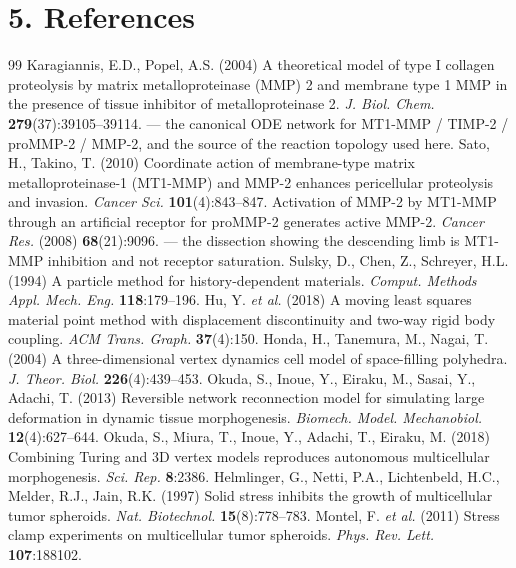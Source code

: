 \documentclass[10pt,a4paper]{article}
\begin{document}
\section*{5.\; References}

{\small
\begin{thebibliography}{99}\setlength{\itemsep}{0pt}
 Karagiannis, E.D., Popel, A.S. (2004) A theoretical model of type I
collagen proteolysis by matrix metalloproteinase (MMP) 2 and membrane type 1 MMP in the presence of
tissue inhibitor of metalloproteinase 2. \emph{J. Biol. Chem.} \textbf{279}(37):39105--39114. --- the
canonical ODE network for MT1-MMP / TIMP-2 / proMMP-2 / MMP-2, and the source of the reaction topology
used here.
 Sato, H., Takino, T. (2010) Coordinate action of membrane-type matrix
metalloproteinase-1 (MT1-MMP) and MMP-2 enhances pericellular proteolysis and invasion.
\emph{Cancer Sci.} \textbf{101}(4):843--847.
 Activation of MMP-2 by MT1-MMP through an artificial receptor for proMMP-2
generates active MMP-2. \emph{Cancer Res.} (2008) \textbf{68}(21):9096. --- the dissection showing the
descending limb is MT1-MMP inhibition and not receptor saturation.
 Sulsky, D., Chen, Z., Schreyer, H.L. (1994) A particle method for
history-dependent materials. \emph{Comput. Methods Appl. Mech. Eng.} \textbf{118}:179--196.
 Hu, Y. \emph{et al.} (2018) A moving least squares material point method with
displacement discontinuity and two-way rigid body coupling. \emph{ACM Trans. Graph.} \textbf{37}(4):150.
 Honda, H., Tanemura, M., Nagai, T. (2004) A three-dimensional vertex dynamics cell
model of space-filling polyhedra. \emph{J. Theor. Biol.} \textbf{226}(4):439--453.
 Okuda, S., Inoue, Y., Eiraku, M., Sasai, Y., Adachi, T. (2013) Reversible network
reconnection model for simulating large deformation in dynamic tissue morphogenesis.
\emph{Biomech. Model. Mechanobiol.} \textbf{12}(4):627--644.
 Okuda, S., Miura, T., Inoue, Y., Adachi, T., Eiraku, M. (2018) Combining Turing
and 3D vertex models reproduces autonomous multicellular morphogenesis. \emph{Sci. Rep.} \textbf{8}:2386.
 Helmlinger, G., Netti, P.A., Lichtenbeld, H.C., Melder, R.J., Jain, R.K.
(1997) Solid stress inhibits the growth of multicellular tumor spheroids. \emph{Nat. Biotechnol.}
\textbf{15}(8):778--783.
 Montel, F. \emph{et al.} (2011) Stress clamp experiments on multicellular tumor
spheroids. \emph{Phys. Rev. Lett.} \textbf{107}:188102.

\end{thebibliography}}
\end{document}
